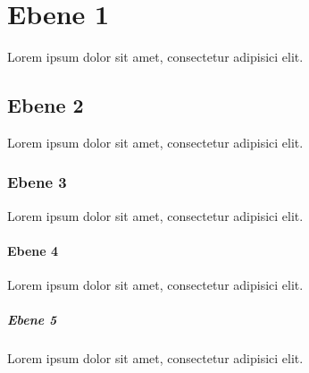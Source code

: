\documentclass[ngerman]{article}
\begin{document}
\thispagestyle{empty}
\section{Ebene 1}
Lorem ipsum dolor sit amet, consectetur adipisici elit.
\subsection{Ebene 2}
Lorem ipsum dolor sit amet, consectetur adipisici elit.
\subsubsection{Ebene 3}
Lorem ipsum dolor sit amet, consectetur adipisici elit.
\paragraph{Ebene 4}
Lorem ipsum dolor sit amet, consectetur adipisici elit.
\subparagraph{Ebene 5}
Lorem ipsum dolor sit amet, consectetur adipisici elit.
\end{document}
